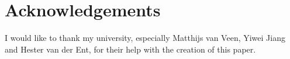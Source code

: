 \section{Acknowledgements}
I would like to thank my university,  especially Matthijs van Veen, Yiwei Jiang and Hester van der Ent, for their help with the creation of this paper.